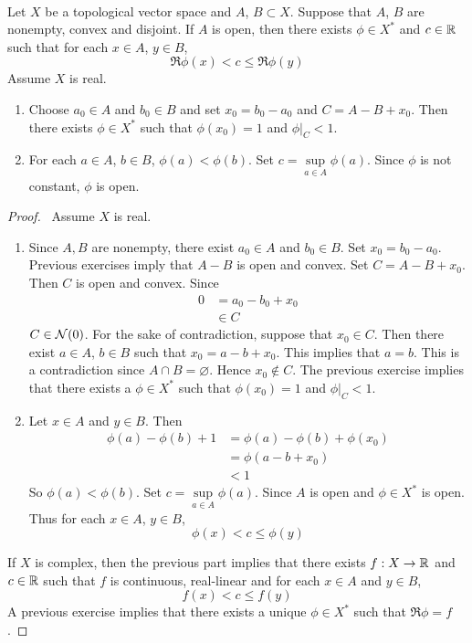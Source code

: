 \documentclass{book}
\begin{document}
	\begin{ex}  \\
		Let $X$ be a topological vector space and $A$, $B \subset X$. Suppose that $A$, $B$ are nonempty, convex and disjoint. If $A$ is open, then there exists $\phi \in X^*$ and $c \in \mathbb{R}$ such that for each $x \in A$, $y \in B$, $$\Re \phi(x) < c \leq \Re \phi(y)$$
		 Assume $X$ is real.
		\begin{enumerate}
			\item Choose $a_0 \in A$ and $b_0 \in B$ and set $x_0 = b_0 - a_0$ and $C = A - B + x_0$. Then there exists $\phi \in X^*$ such that $\phi(x_0) = 1$ and $\phi|_C < 1$.
			\item For each $a \in A$, $b \in B$, $\phi(a) < \phi(b)$. Set $c = \sup\limits_{a \in A}\phi(a)$. Since $\phi$ is not constant, $\phi$ is open.
		\end{enumerate}
	\end{ex}
	
	\begin{proof}\
		Assume $X$ is real.
		\begin{enumerate}
			\item Since $A, B$ are nonempty, there exist $a_0 \in A$ and $b_0 \in B$. Set $x_0 = b_0 - a_0$. Previous exercises imply that $A - B$ is open and convex. Set $C = A - B + x_0$. Then $C$ is open and convex. 
			Since  
			\begin{align*}
				0 
				&= a_0 - b_0 + x_0 \\
				&\in C
			\end{align*}
			$C \in \mathcal{N}(0)$. For the sake of contradiction, suppose that $x_0 \in C$. Then there exist $a \in A$, $b \in B$ such that $x_0 = a - b + x_0$. This implies that $a = b$. This is a contradiction since $A \cap B = \varnothing$. Hence $x_0 \not \in C$. The previous exercise implies that there exists a $\phi \in X^*$ such that $\phi(x_0) = 1$ and  $\phi|_C < 1$. 
			\item Let $x \in A$ and $y \in B$. Then 
			\begin{align*}
				\phi(a) - \phi(b) + 1
				&= \phi(a) - \phi(b) + \phi(x_0) \\
				&= \phi(a - b + x_0) \\
				& < 1
			\end{align*}
			So $\phi(a) < \phi(b)$. Set $c = \sup\limits_{a \in A}\phi(a)$. Since $A$ is open and $\phi \in X^*$ is open. Thus for each $x \in A$, $y \in B$, 
			$$\phi(x) < c \leq \phi(y)$$
		\end{enumerate}
	If $X$ is complex, then the previous part implies that there exists $f:X \rightarrow \mathbb{R}$ and $c \in \mathbb{R}$ such that $f$ is continuous, real-linear and for each $x \in A$ and $y \in B$, 
	$$f(x) < c \leq f(y)$$ 
	A previous exercise implies that there exists a unique $\phi \in X^*$ such that $\Re \phi = f$.
	\end{proof}
	
\end{document}
